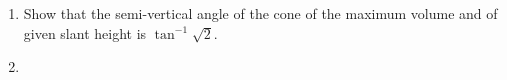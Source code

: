 \begin{enumerate}[label=\thechapter.\arabic*,ref=\thechapter.\theenumi]
    \item Show that the semi-vertical angle of the cone of the maximum volume 
    and of given slant height is $\tan^{-1}\sqrt{2}$.
    \\
    \solution
		
\item
\label{12/6/6/8}

    
\end{enumerate}
